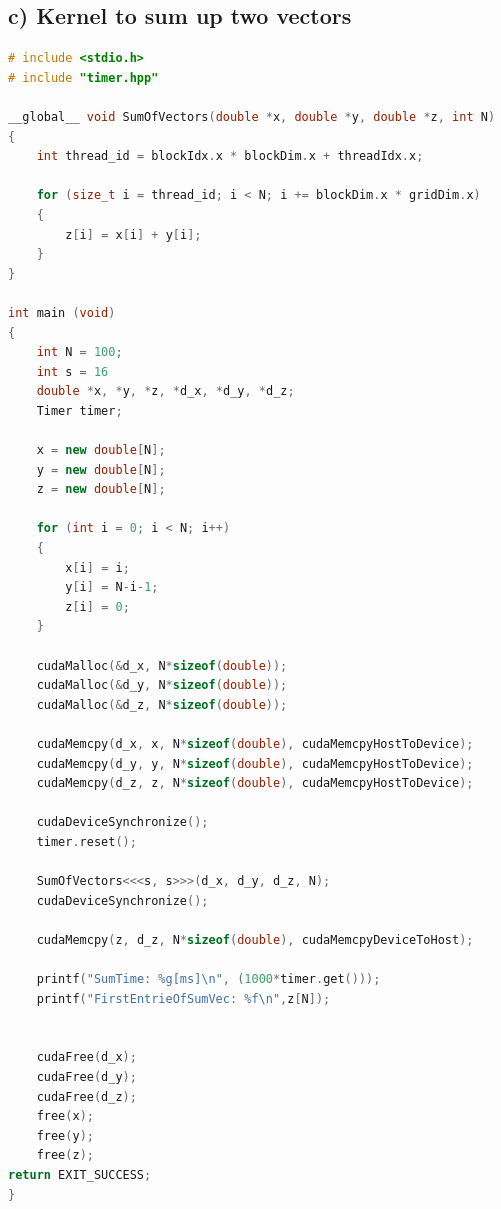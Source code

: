 \documentclass[11pt,a4paper]{article}
\begin{document}
\subsection*{c) Kernel to sum up two vectors}
\begin{lstlisting}[language=C++, caption={code for c)}]
# include <stdio.h>
# include "timer.hpp"

__global__ void SumOfVectors(double *x, double *y, double *z, int N)
{
	int thread_id = blockIdx.x * blockDim.x + threadIdx.x;

	for (size_t i = thread_id; i < N; i += blockDim.x * gridDim.x)
	{
		z[i] = x[i] + y[i];
	}
}

int main (void)
{
	int N = 100;
	int s = 16
	double *x, *y, *z, *d_x, *d_y, *d_z;
	Timer timer;

	x = new double[N];
	y = new double[N];
	z = new double[N];

	for (int i = 0; i < N; i++)
	{
		x[i] = i;
		y[i] = N-i-1;
		z[i] = 0;
	}

	cudaMalloc(&d_x, N*sizeof(double));
	cudaMalloc(&d_y, N*sizeof(double));
	cudaMalloc(&d_z, N*sizeof(double));

	cudaMemcpy(d_x, x, N*sizeof(double), cudaMemcpyHostToDevice);
	cudaMemcpy(d_y, y, N*sizeof(double), cudaMemcpyHostToDevice);
	cudaMemcpy(d_z, z, N*sizeof(double), cudaMemcpyHostToDevice);

	cudaDeviceSynchronize();
	timer.reset();

	SumOfVectors<<<s, s>>>(d_x, d_y, d_z, N);
	cudaDeviceSynchronize();

	cudaMemcpy(z, d_z, N*sizeof(double), cudaMemcpyDeviceToHost);

	printf("SumTime: %g[ms]\n", (1000*timer.get()));
	printf("FirstEntrieOfSumVec: %f\n",z[N]);


	cudaFree(d_x);
	cudaFree(d_y);
	cudaFree(d_z);
	free(x);
	free(y);
	free(z);
return EXIT_SUCCESS;
}
\end{lstlisting}
\end{document}
